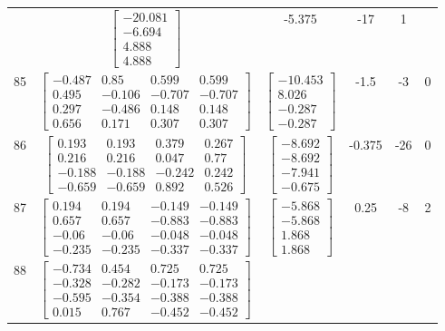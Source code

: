 \documentclass[a4paper,12pt]{article}
\begin{document}
\begin{tabular}{c c c c c c}
&
$\begin{bmatrix} -20.081 \\ -6.694 \\ 4.888 \\ 4.888 \end{bmatrix}$
&
-5.375
&
-17
&
1
\\
85
&
$\begin{bmatrix} -0.487 & 0.85 & 0.599 & 0.599 \\ 0.495 & -0.106 & -0.707 & -0.707 \\ 0.297 & -0.486 & 0.148 & 0.148 \\ 0.656 & 0.171 & 0.307 & 0.307 \end{bmatrix}$
&
$\begin{bmatrix} -10.453 \\ 8.026 \\ -0.287 \\ -0.287 \end{bmatrix}$
&
-1.5
&
-3
&
0
\\
86
&
$\begin{bmatrix} 0.193 & 0.193 & 0.379 & 0.267 \\ 0.216 & 0.216 & 0.047 & 0.77 \\ -0.188 & -0.188 & -0.242 & 0.242 \\ -0.659 & -0.659 & 0.892 & 0.526 \end{bmatrix}$
&
$\begin{bmatrix} -8.692 \\ -8.692 \\ -7.941 \\ -0.675 \end{bmatrix}$
&
-0.375
&
-26
&
0
\\
87
&
$\begin{bmatrix} 0.194 & 0.194 & -0.149 & -0.149 \\ 0.657 & 0.657 & -0.883 & -0.883 \\ -0.06 & -0.06 & -0.048 & -0.048 \\ -0.235 & -0.235 & -0.337 & -0.337 \end{bmatrix}$
&
$\begin{bmatrix} -5.868 \\ -5.868 \\ 1.868 \\ 1.868 \end{bmatrix}$
&
0.25
&
-8
&
2
\\
88
&
$\begin{bmatrix} -0.734 & 0.454 & 0.725 & 0.725 \\ -0.328 & -0.282 & -0.173 & -0.173 \\ -0.595 & -0.354 & -0.388 & -0.388 \\ 0.015 & 0.767 & -0.452 & -0.452 \end{bmatrix}$

\end{tabular}
\end{document}
